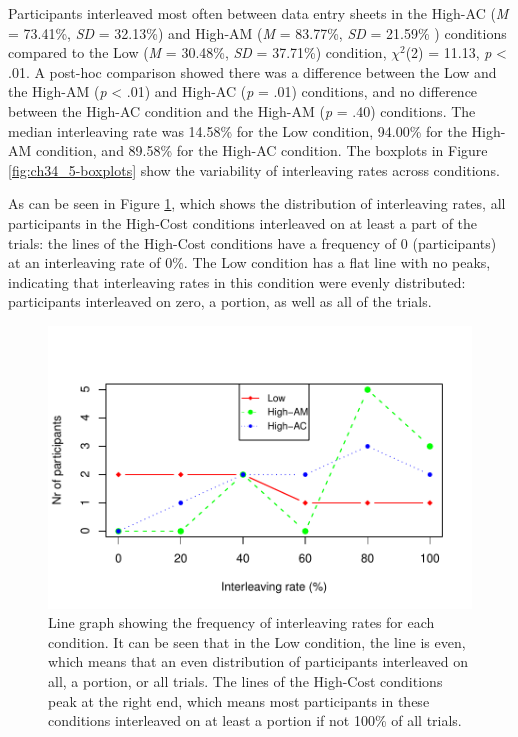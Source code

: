 Participants interleaved most often between data entry sheets in the High-AC (\textit{M} = 73.41\%, \textit{SD} = 32.13\%) and High-AM (\textit{M} = 83.77\%, \textit{SD} = 21.59\% ) conditions compared to the Low (\textit{M} = 30.48\%, \textit{SD} = 37.71\%) condition, $\chi^2$(2) = 11.13, \textit{p} < .01. A post-hoc comparison showed there was a difference between the Low and the High-AM (\textit{p} < .01) and High-AC (\textit{p} = .01) conditions, and no difference between the High-AC condition and the High-AM (\textit{p} = .40) conditions. The median interleaving rate was 14.58\% for the Low condition, 94.00\% for the High-AM condition, and 89.58\% for the High-AC condition. The boxplots in Figure \ref{fig:ch34_5-boxplots} show the variability of interleaving rates across conditions. 

As can be seen in Figure \ref{fig:ch34_5-linechart}, which shows the distribution of interleaving rates, all participants in the High-Cost conditions interleaved on at least a part of the trials: the lines of the High-Cost conditions have a frequency of 0 (participants) at an interleaving rate of 0\%. The Low condition has a flat line with no peaks, indicating that interleaving rates in this condition were evenly distributed: participants interleaved on zero, a portion, as well as all of the trials.

\begin{figure}
 \includegraphics[width=\textwidth]{images/ch34/ch34-5_linechart.pdf}
\caption[Study 5 frequency of interleaving rates]{Line graph showing the frequency of interleaving rates for each condition. It can be seen that in the Low condition, the line is even, which means that an even distribution of participants interleaved on all, a portion, or all trials. The lines of the High-Cost conditions peak at the right end, which means most participants in these conditions interleaved on at least a portion if not 100\% of all trials.}
\label{fig:ch34_5-linechart}
\end{figure}

